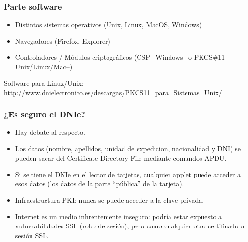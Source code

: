 \documentclass{beamer}
\begin{document}

\begin{frame}
\frametitle{Parte software}

\begin{itemize}
\item Distintos sistemas operativos (Unix, Linux, MacOS, Windows)
\item Navegadores (Firefox, Explorer)
\item Controladores / Módulos criptográficos (CSP --Windows-- o PKCS\#11 --Unix/Linux/Mac--)
\end{itemize}

\medskip

\small
Software para Linux/Unix: \\
\url{http://www.dnielectronico.es/descargas/PKCS11_para\_Sistemas\_Unix/}

\end{frame}


\begin{frame}
\frametitle{¿Es seguro el DNIe?}

\begin{itemize}
\item Hay debate al respecto.
\item Los datos (nombre, apellidos, unidad de expedicion, nacionalidad y DNI) se pueden sacar del Certificate Directory File mediante comandos APDU.
\item Si se tiene el DNIe en el lector de tarjetas, cualquier applet puede acceder a esos datos (los datos de la parte ``pública'' de la tarjeta).
\item Infraestructura PKI: nunca se puede acceder a la clave privada.
\item Internet es un medio inhrentemente inseguro: podría estar expuesto a vulnerabilidades SSL (robo de sesión), pero como cualquier otro certificado o sesión SSL. 
\end{itemize}

\medskip

\end{frame}


\end{document}
